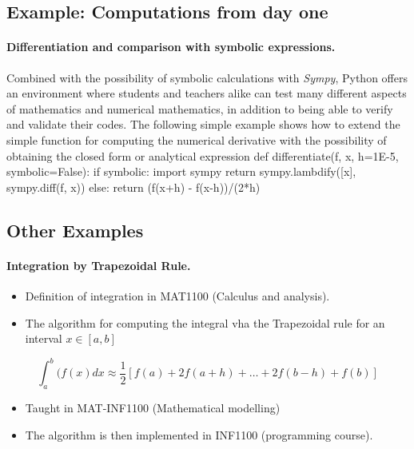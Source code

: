 \documentclass[%
twoside,                 %
final,                   %
10pt]{article}
\begin{document}
\subsection{Example: Computations from day one}

\paragraph{Differentiation and comparison with symbolic expressions.}
Combined with the possibility of symbolic calculations with \emph{Sympy}, Python offers an environment where students and teachers alike can test many different aspects of mathematics and numerical mathematics, in addition to being able to verify and validate their codes. The following simple example shows how to extend the simple function for computing the numerical derivative with the possibility of obtaining the closed form or analytical expression
\bpycod
def differentiate(f, x, h=1E-5, symbolic=False):
    if symbolic:
        import sympy
        return sympy.lambdify([x], sympy.diff(f, x))
    else:
        return (f(x+h) - f(x-h))/(2*h)
\epycod





\subsection{Other Examples}

\paragraph{Integration by Trapezoidal Rule.}

\begin{itemize}
\item Definition of integration  in MAT1100 (Calculus and analysis).

\item The algorithm for computing the  integral vha the Trapezoidal rule for an interval $x \in [a,b]$
\end{itemize}

\noindent
\[
  \int_a^b(f(x) dx \approx \frac{1}{2}\left [f(a)+2f(a+h)+\dots+2f(b-h)+f(b)\right] 
\]
\begin{itemize}
\item Taught   in MAT-INF1100  (Mathematical modelling)

\item The algorithm is then implemented in  INF1100 (programming course).
\end{itemize}
\end{document}
